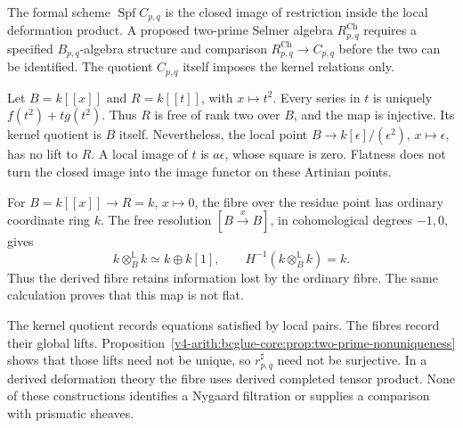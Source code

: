 \begin{definition}
\label{v4-arith:bcglue-core:def:cross-prime-chenevier}
The formal scheme $\operatorname{Spf}C_{p,q}$ is the closed image
of restriction inside the local deformation product.
A proposed two-prime Selmer algebra $R_{p,q}^{\mathrm{Ch}}$
requires a specified $B_{p,q}$-algebra structure and comparison
$R_{p,q}^{\mathrm{Ch}}\to C_{p,q}$ before the two can be identified.
The quotient $C_{p,q}$ itself imposes the kernel relations only.
\end{definition}

\begin{example}
\label{v4-arith:bcglue-core:ex:closed-image}
Let $B=k[[x]]$ and $R=k[[t]]$, with $x\mapsto t^2$.
Every series in $t$ is uniquely $f(t^2)+t g(t^2)$.
Thus $R$ is free of rank two over $B$, and the map is injective.
Its kernel quotient is $B$ itself.
Nevertheless, the local point
$B\to k[\epsilon]/(\epsilon^2)$, $x\mapsto\epsilon$, has no lift
to $R$. A local image of $t$ is $a\epsilon$, whose square is zero.
Flatness does not turn the closed image into the image functor
on these Artinian points.
\end{example}

\begin{example}
\label{v4-arith:bcglue-core:ex:derived-fibre}
For $B=k[[x]]\to R=k$, $x\mapsto0$, the fibre over the residue
point has ordinary coordinate ring $k$.
The free resolution $[B\xrightarrow{x}B]$, in cohomological
degrees $-1,0$, gives
\[
 k\otimes_B^{\mathbb L}k\simeq k\oplus k[1],\qquad
 H^{-1}(k\otimes_B^{\mathbb L}k)=k.
\]
Thus the derived fibre retains information lost by the ordinary
fibre. The same calculation proves that this map is not flat.
\end{example}

\begin{remark}
\label{v4-arith:bcglue-core:rem:why-chenevier}
The kernel quotient records equations satisfied by local pairs.
The fibres record their global lifts.
Proposition~\ref{v4-arith:bcglue-core:prop:two-prime-nonuniqueness}
shows that those lifts need not be unique, so
$r_{p,q}^{\sharp}$ need not be surjective.
In a derived deformation theory the fibre uses derived completed
tensor product. None of these constructions identifies a Nygaard
filtration or supplies a comparison with prismatic sheaves.
\end{remark}

